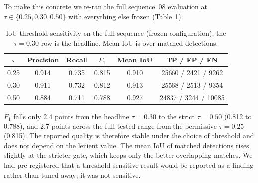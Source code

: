To make this concrete we re-ran the full sequence~08 evaluation at
$\tau \in \{0.25, 0.30, 0.50\}$ with everything else frozen
(Table~\ref{tab:iou-sensitivity}).

\begin{table}[H]
  \centering
  \caption[IoU threshold sensitivity]{IoU threshold sensitivity on the full
    sequence (frozen configuration); the $\tau = 0.30$ row is the headline. Mean IoU is
    over matched detections.}
  \label{tab:iou-sensitivity}
  \begin{tabular}{cccccc}
    \toprule
    $\tau$ & Precision & Recall & $F_1$ & Mean IoU & TP / FP / FN \\
    \midrule
    0.25 & 0.914 & 0.735 & 0.815 & 0.910 & \num{25660} / \num{2421} / \num{9262} \\
    0.30 & 0.911 & 0.732 & 0.812 & 0.913 & \num{25568} / \num{2513} / \num{9354} \\
    0.50 & 0.884 & 0.711 & 0.788 & 0.927 & \num{24837} / \num{3244} / \num{10085} \\
    \bottomrule
  \end{tabular}
\end{table}

$F_1$ falls only \num{2.4} points from the headline $\tau = 0.30$ to the strict
$\tau = 0.50$ (\num{0.812} to \num{0.788}), and \num{2.7} points across the full
tested range from the permissive $\tau = 0.25$ (\num{0.815}). The reported
quality is therefore stable under the choice of threshold and does not depend on the lenient
value. The mean IoU of matched detections rises slightly at the stricter gate, which keeps
only the better overlapping matches. We had
pre-registered that a threshold-sensitive result would be reported as a
finding rather than tuned away; it was not sensitive.



%
%
